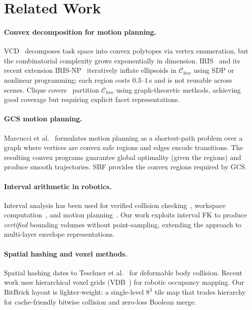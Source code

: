 \documentclass[journal]{IEEEtran}
\newcommand{\Cfree}{\mathcal{C}_\text{free}}
\begin{document}
\section{Related Work}\label{sec:related}

\paragraph{Convex decomposition for motion planning.}
VCD~\cite{werner2024vcd} decomposes task space into convex polytopes
via vertex enumeration, but the combinatorial complexity grows
exponentially in dimension.
IRIS~\cite{deits2015computing} and its recent extension
IRIS-NP~\cite{werner2024fast} iteratively inflate ellipsoids
in $\Cfree$ using SDP or nonlinear programming;
each region costs $0.3$--$1$\,s and is not reusable across scenes.
Clique covers~\cite{amice2024clique} partition $\Cfree$ using
graph-theoretic methods, achieving good coverage but requiring
explicit facet representations.

\paragraph{GCS motion planning.}
Marcucci et al.~\cite{marcucci2024motion} formulates motion
planning as a shortest-path problem over a graph where
vertices are convex safe regions and edges encode transitions.
The resulting convex programs guarantee global optimality
(given the regions) and produce smooth trajectories.
SBF provides the convex regions required by GCS.

\paragraph{Interval arithmetic in robotics.}
Interval analysis has been used for verified collision
checking~\cite{merlet2004solving}, workspace
computation~\cite{merlet2006interval}, and motion
planning~\cite{jaulin2001applied}.
Our work exploits interval FK to produce \emph{certified}
bounding volumes without point-sampling, extending the
approach to multi-layer envelope representations.

\paragraph{Spatial hashing and voxel methods.}
Spatial hashing dates to Teschner et al.~\cite{teschner2003optimized}
for deformable body collision.
Recent work uses hierarchical voxel grids (VDB~\cite{museth2013vdb})
for robotic occupancy mapping.
Our BitBrick layout is lighter-weight: a single-level
$8^3$ tile map that trades hierarchy for cache-friendly
bitwise collision and zero-loss Boolean merge.
\end{document}
